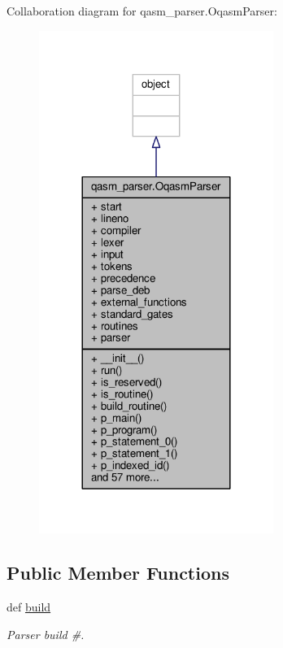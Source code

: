 Collaboration diagram for qasm\-\_\-parser.\-Oqasm\-Parser\-:
\nopagebreak
\begin{figure}[H]
\begin{center}
\leavevmode
\includegraphics[width=216pt]{d5/d37/classqasm__parser_1_1OqasmParser__coll__graph}
\end{center}
\end{figure}
\subsection*{Public Member Functions}
\begin{DoxyCompactItemize}
\item 
def \hyperlink{classqasm__parser_1_1OqasmParser_a35f30736430b17da2312ad7bd5985721}{build}
\begin{DoxyCompactList}\small\item\em Parser build \#. \end{DoxyCompactList}\end{DoxyCompactItemize}



